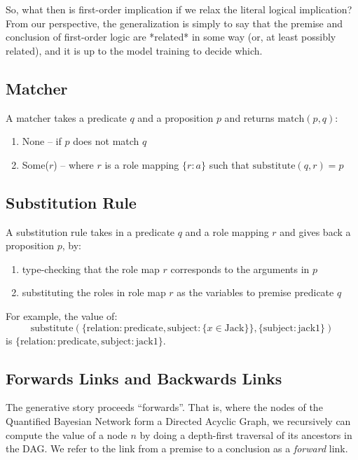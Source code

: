 \documentclass[12pt]{article}
\begin{document}
So, what then is first-order implication if we relax the literal logical implication?
From our perspective, the generalization is simply to say that the premise and conclusion of first-order logic are *related* in some way (or, at least possibly related), and it is up to the model training to decide which.

\subsection{Matcher}
A matcher takes a predicate \( q \) and a proposition \( p \) and returns \( \text{match}(p, q) \):
\begin{enumerate}
    \item None -- if \( p \) does not match \( q \)
    \item Some(\( r \)) -- where \( r \) is a role mapping \( \{r: a\} \) such that \( \text{substitute}(q, r) = p \)
\end{enumerate}

\subsection{Substitution Rule}
A substitution rule takes in a predicate \( q \) and a role mapping \( r \) and gives back a proposition \( p \), by:
\begin{enumerate}
    \item type-checking that the role map \( r \) corresponds to the arguments in \( p \)
    \item substituting the roles in role map \( r \) as the variables to premise predicate \( q \)
\end{enumerate}

For example, the value of:
\[ \text{substitute}(\{\text{relation}: \text{predicate}, \text{subject}:\{x \in \text{Jack}\}\}, \{\text{subject}:\text{jack1}\}) \]
is \( \{\text{relation}: \text{predicate}, \text{subject}:\text{jack1}\} \).



\subsection{Forwards Links and Backwards Links}
The generative story proceeds ``forwards''.
That is, where the nodes of the Quantified Bayesian Network form a Directed Acyclic Graph, we recursively can compute the value of a node \( n \) by doing a depth-first traversal of its ancestors in the DAG.
We refer to the link from a premise to a conclusion as a \emph{forward} link.
\end{document}
